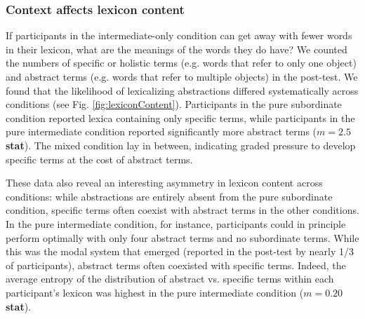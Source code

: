 \documentclass[10pt,letterpaper]{article}
\begin{document}
\subsubsection{Context affects lexicon content}


If participants in the intermediate-only condition can get away with fewer words in their lexicon, what are the meanings of the words they do have? We counted the numbers of specific or holistic terms (e.g. words that refer to only one object) and abstract terms (e.g. words that refer to multiple objects) in the post-test. We found that the likelihood of lexicalizing abstractions differed systematically across conditions (see Fig. \ref{fig:lexiconContent}). Participants in the pure subordinate condition reported lexica containing only specific terms, while participants in the pure intermediate condition reported significantly more abstract terms ($m = 2.5$ \textbf{stat}). The mixed condition lay in between, indicating graded pressure to develop specific terms at the cost of abstract terms. 

These data also reveal an interesting asymmetry in lexicon content across conditions: while abstractions are entirely absent from the pure subordinate condition, specific terms often coexist with abstract terms in the other conditions. In the pure intermediate condition, for instance, participants could in principle perform optimally with only four abstract terms and no subordinate terms. While this was the modal system that emerged (reported in the post-test by nearly 1/3 of participants), abstract terms often coexisted with specific terms. Indeed, the average entropy of the distribution of abstract vs. specific terms within each participant's lexicon was highest in the pure intermediate condition ($m = 0.20$ \textbf{stat}). 
\end{document}
